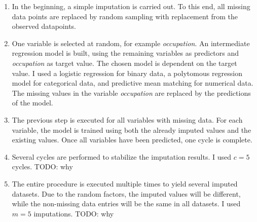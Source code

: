 \begin{enumerate}
\item In the beginning, a simple imputation is carried out. To
  this end, all missing data points are replaced by random sampling
  with replacement from the observed datapoints.
\item One variable is selected at random, for example
  \emph{occupation}. An intermediate regression model is built, using
  the remaining variables as predictors and \emph{occupation} as target
  value. The chosen model is dependent on the target value. I used a
  logistic regression for binary data, a polytomous regression model
  for categorical data, and predictive mean matching for numerical
  data. The missing values in the variable \emph{occupation} are replaced by the
  predictions of the model.
\item The previous step is executed for all variables with missing
  data. For each variable, the model is trained using both the already imputed values and the existing values. Once all variables have been predicted, one cycle is complete.
\item Several cycles are performed to stabilize the imputation
  results. I used $c = 5$ cycles. TODO: why
\item The entire procedure is executed multiple times to yield
  several imputed datasets. Due to the random factors, the imputed
  values will be different, while the non-missing data entries will be
  the same in all datasets. I used $m = 5$ imputations. TODO: why
\end{enumerate}